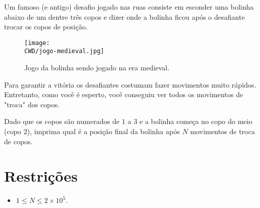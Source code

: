 %

Um famoso (e antigo) desafio jogado nas ruas consiste em esconder uma bolinha abaixo de um dentre três copos e dizer onde a bolinha ficou após o desafiante trocar os copos de posição.

\begin{figure}[H]
  \centering
  \texttt{[image: \\CWD/jogo-medieval.jpg]}
  \caption{Jogo da bolinha sendo jogado na era medieval.}
\end{figure}

Para garantir a vitória os desafiantes costumam fazer movimentos muito rápidos. Entretanto, como você é esperto, você conseguiu ver todos os movimentos de "troca" dos copos. 

Dado que os copos são numerados de $1$ a $3$ e a bolinha começa no copo do meio (copo $2$), imprima qual é a posição final da bolinha após $N$ movimentos de troca de copos.

%
%

%
%


\section*{Restrições}

\begin{itemize}
\item $1 \leq N \leq 2\times 10^5$.
\end{itemize}


\sampleio
